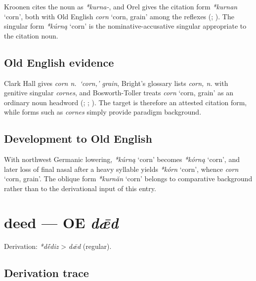 \documentclass[
  british,
  a4paper,
  openany]{book}
\providecommand{\Recon}[1]{\emph{*#1}}
{\catcode`→=\active \global\def→{\ensuremath{\rightarrow}}}
\providecommand{\texorpdfstring}[2]{#1}
\providecommand{\Recon}[1]{\emph{*#1}}
{\catcode`→=\active \global\def→{\ensuremath{\rightarrow}}}
\begin{document}
Kroonen cites the noun as \emph{*kurna-}, and Orel gives the citation
form \Recon{kurnan} `corn', both with Old English {\emph{corn}} `corn,
grain' among the reflexes (;
). The singular form
\Recon{kúrną} `corn' is the nominative-accusative singular appropriate
to the citation noun.

\subsection{Old English evidence}\label{old-english-evidence-11}

Clark Hall gives \emph{corn n.~`corn,' grain}, Bright's glossary lists
\emph{corn, n.} with genitive singular \emph{cornes}, and
Bosworth-Toller treats {\emph{corn}} `corn, grain' as an ordinary noun
headword (;
;
). The
target is therefore an attested citation form, while forms such as
\emph{cornes} simply provide paradigm background.

\subsection{Development to Old
English}\label{development-to-old-english-11}

With northwest Germanic lowering, \Recon{kúrną} `corn' becomes
\Recon{kórną} `corn', and later loss of final nasal after a heavy
syllable yields \Recon{kórn} `corn', whence {\emph{corn}} `corn, grain'.
The oblique form \Recon{kurnăn} `corn' belongs to comparative background
rather than to the derivational input of this entry.

\section{\texorpdfstring{deed --- OE
\emph{dǣd}}{deed --- OE dǣd}}\label{deed-oe-dux1e3d}


Derivation: \emph{*dḗdiz} \textgreater{} \emph{dǣd} (regular).

\subsection{Derivation trace}\label{derivation-trace-12}
\end{document}
